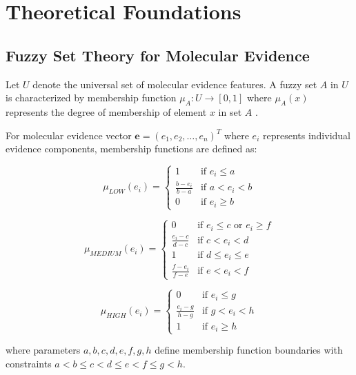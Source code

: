 
\section{Theoretical Foundations}

\subsection{Fuzzy Set Theory for Molecular Evidence}

Let $U$ denote the universal set of molecular evidence features. A fuzzy set $A$ in $U$ is characterized by membership function $\mu_A: U \rightarrow [0,1]$ where $\mu_A(x)$ represents the degree of membership of element $x$ in set $A$ \cite{zadeh1965fuzzy}.

For molecular evidence vector $\mathbf{e} = (e_1, e_2, \ldots, e_n)^T$ where $e_i$ represents individual evidence components, membership functions are defined as:

\begin{equation}
\mu_{LOW}(e_i) = \begin{cases}
1 & \text{if } e_i \leq a \\
\frac{b - e_i}{b - a} & \text{if } a < e_i < b \\
0 & \text{if } e_i \geq b
\end{cases}
\end{equation}

\begin{equation}
\mu_{MEDIUM}(e_i) = \begin{cases}
0 & \text{if } e_i \leq c \text{ or } e_i \geq f \\
\frac{e_i - c}{d - c} & \text{if } c < e_i < d \\
1 & \text{if } d \leq e_i \leq e \\
\frac{f - e_i}{f - e} & \text{if } e < e_i < f
\end{cases}
\end{equation}

\begin{equation}
\mu_{HIGH}(e_i) = \begin{cases}
0 & \text{if } e_i \leq g \\
\frac{e_i - g}{h - g} & \text{if } g < e_i < h \\
1 & \text{if } e_i \geq h
\end{cases}
\end{equation}

where parameters $a, b, c, d, e, f, g, h$ define membership function boundaries with constraints $a < b \leq c < d \leq e < f \leq g < h$.

